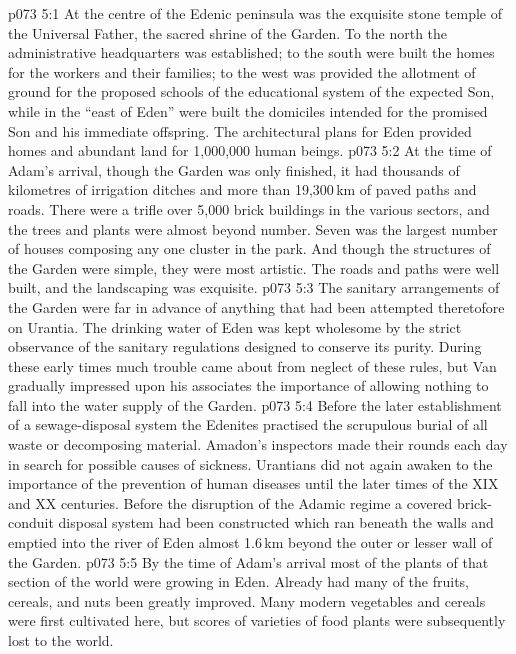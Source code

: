 \vs p073 5:1 At the centre of the Edenic peninsula was the exquisite stone temple of the Universal Father, the sacred shrine of the Garden. To the north the administrative headquarters was established; to the south were built the homes for the workers and their families; to the west was provided the allotment of ground for the proposed schools of the educational system of the expected Son, while in the “east of Eden” were built the domiciles intended for the promised Son and his immediate offspring. The architectural plans for Eden provided homes and abundant land for 1,000,000 human beings.
\vs p073 5:2 At the time of Adam’s arrival, though the Garden was only  finished, it had thousands of kilometres of irrigation ditches and more than 19,300\,km of paved paths and roads. There were a trifle over 5,000 brick buildings in the various sectors, and the trees and plants were almost beyond number. Seven was the largest number of houses composing any one cluster in the park. And though the structures of the Garden were simple, they were most artistic. The roads and paths were well built, and the landscaping was exquisite.
\vs p073 5:3 The sanitary arrangements of the Garden were far in advance of anything that had been attempted theretofore on Urantia. The drinking water of Eden was kept wholesome by the strict observance of the sanitary regulations designed to conserve its purity. During these early times much trouble came about from neglect of these rules, but Van gradually impressed upon his associates the importance of allowing nothing to fall into the water supply of the Garden.
\vs p073 5:4 Before the later establishment of a sewage\hyp{}disposal system the Edenites practised the scrupulous burial of all waste or decomposing material. Amadon’s inspectors made their rounds each day in search for possible causes of sickness. Urantians did not again awaken to the importance of the prevention of human diseases until the later times of the XIX and XX centuries. Before the disruption of the Adamic regime a covered brick\hyp{}conduit disposal system had been constructed which ran beneath the walls and emptied into the river of Eden almost 1.6\,km beyond the outer or lesser wall of the Garden.
\vs p073 5:5 By the time of Adam’s arrival most of the plants of that section of the world were growing in Eden. Already had many of the fruits, cereals, and nuts been greatly improved. Many modern vegetables and cereals were first cultivated here, but scores of varieties of food plants were subsequently lost to the world.
